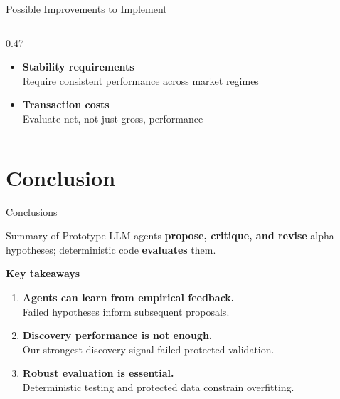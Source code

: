 \documentclass[10pt,aspectratio=169]{beamer}
\begin{document}
\begin{frame}{Possible Improvements to Implement}
\begin{columns}[T,onlytextwidth]
\begin{column}{0.47\textwidth}
\begin{itemize}
    \item \textbf{Stability requirements}\\
    {\scriptsize Require consistent performance across market regimes}
    
    \item \textbf{Transaction costs}\\
    {\scriptsize Evaluate net, not just gross, performance}
\end{itemize}

\end{column}

\end{columns}

\vspace{0.10cm}

\end{frame}


\section{Conclusion}
\begin{frame}{Conclusions}

\small

\begin{block}{Summary of Prototype}
LLM agents \textbf{propose, critique, and revise} alpha hypotheses;
deterministic code \textbf{evaluates} them.
\end{block}

\vspace{0.12cm}

\textbf{Key takeaways}

\begin{enumerate}

    \item \textbf{Agents can learn from empirical feedback.}\\
    {\scriptsize Failed hypotheses inform subsequent proposals.}

    \vspace{0.08cm}

    \item \textbf{Discovery performance is not enough.}\\
    {\scriptsize Our strongest discovery signal failed protected validation.}

    \vspace{0.08cm}

    \item \textbf{Robust evaluation is essential.}\\
    {\scriptsize Deterministic testing and protected data constrain overfitting.}

\end{enumerate}


\end{frame}
\end{document}
